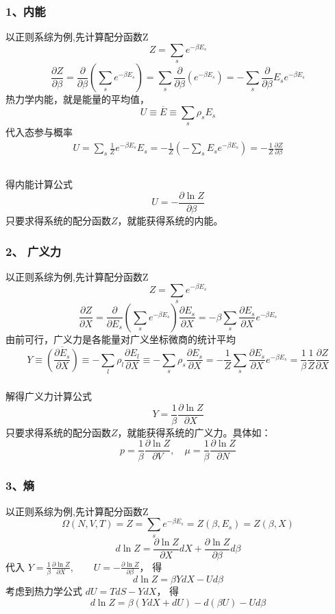 \begin{frame}
  \frametitle{ 1、内能}
  以正则系综为例,先计算配分函数Z
  \[ Z = \sum_s e^{-\beta E_s}\]
  \[ \frac{\partial Z}{\partial \beta } = \frac{\partial }{\partial \beta } (\sum_s e^{-\beta E_s})
    = \sum_s \frac{\partial }{\partial \beta } ( e^{-\beta E_s}) =  - \sum_s \frac{\partial }{\partial \beta } E_s e^{-\beta E_s} \]
  热力学内能，就是能量的平均值，
  \[ U \equiv \overline{E} \equiv  \sum_s \rho _s E_s \]
  代入态参与概率
  \[ \begin{aligned}
    U = \sum_s \frac{1}{Z} e^{-\beta E_s} E_s = -\frac{1}{Z} ( - \sum_s E_s e^{-\beta E_s} )  = - \frac{1}{Z} \frac{\partial Z}{\partial \beta } \\ 
  \end{aligned}\]
\end{frame} 

\begin{frame}
  \frametitle{}
  得内能计算公式
  \[ \boxed{U = -  \frac{\partial \ln Z}{\partial \beta }} \]
  只要求得系统的配分函数$Z$，就能获得系统的内能。
\end{frame} 

\begin{frame}
  \frametitle{ 2、 广义力 }
  以正则系综为例,先计算配分函数Z
  \[ Z = \sum_s e^{-\beta E_s}\]
  \[ \frac{\partial Z}{\partial X } = \frac{\partial }{\partial E_s} (\sum_s e^{-\beta E_s}) \frac{\partial E_s}{\partial X } 
    = - \beta \sum_s \frac{\partial E_s}{\partial X } e^{-\beta E_s} \]
  由前可行，广义力是各能量对广义坐标微商的统计平均 
  \[Y \equiv  \overline{(\frac{\partial E_s}{\partial X })} \equiv  - \sum_l \rho _l \frac{\partial E_l }{\partial X} \equiv - \sum_s \rho _s \frac{\partial E_s }{\partial X} = - \frac{1}{Z} \sum_s \frac{\partial E_s }{\partial X} e^{-\beta E_s}  = \frac{1}{\beta} \frac{1}{Z} \frac{\partial Z}{\partial X }\] 
\end{frame}

 \begin{frame}
   \frametitle{}
解得广义力计算公式
\[ \boxed{Y = \frac{1}{\beta} \frac{\partial \ln Z}{\partial X }} \]
只要求得系统的配分函数$Z$，就能获得系统的广义力。具体如：
\[ \boxed{p = \frac{1}{\beta} \frac{\partial \ln Z}{\partial V }}, \quad  \boxed{\mu = \frac{1}{\beta} \frac{\partial \ln Z}{\partial N }} \]
 \end{frame} 

\begin{frame}
  \frametitle{ 3、熵 }
  以正则系综为例,先计算配分函数Z
  \[\Omega (N,V,T) = Z = \sum_s e^{-\beta E_s} =Z(\beta, E_s ) = Z(\beta, X )\]
  \[ d \ln Z  = \frac{\partial \ln Z }{\partial X } dX + \frac{\partial \ln Z }{\partial \beta } d \beta  \]
  代入 $ Y = \frac{1}{\beta} \frac{\partial \ln Z}{\partial X }, \qquad U = -  \frac{\partial \ln Z}{\partial \beta } $， 得
  \[ d \ln Z  = \beta Y dX -U d \beta  \]
  考虑到热力学公式 $ dU = TdS - YdX $， 得 
  \[ d \ln Z  = \beta (Y dX + dU) - d(\beta U )- U d \beta  \]
\end{frame} 

